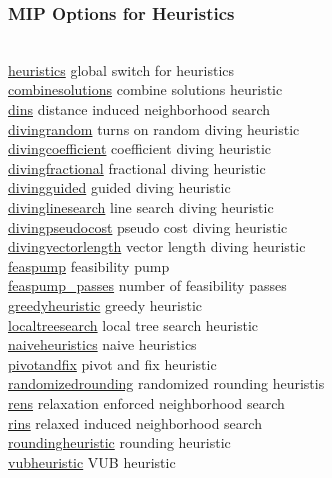 \subsubsection{MIP Options for Heuristics}
\begin{tabbing}
\hspace {1.3in} \= \\
\hyperlink{heuristics}
{heuristics} \> global switch for heuristics \\
\hyperlink{combinesolutions}
{combinesolutions} \> combine solutions heuristic \\
\hyperlink{dins}
{dins} \> distance induced neighborhood search \\
\hyperlink{divingrandom}
{divingrandom} \> turns on random diving heuristic \\
\hyperlink{divingcoefficient}
{divingcoefficient} \> coefficient diving heuristic \\
\hyperlink{divingfractional}
{divingfractional} \> fractional diving heuristic \\
\hyperlink{divingguided}
{divingguided} \> guided diving heuristic \\
\hyperlink{divinglinesearch}
{divinglinesearch} \> line search diving heuristic \\
\hyperlink{divingpseudocost}
{divingpseudocost} \> pseudo cost diving heuristic \\
\hyperlink{divingvectorlength}
{divingvectorlength} \> vector length diving heuristic \\
\hyperlink{feaspump}
{feaspump} \> feasibility pump \\
\hyperlink{feaspump_passes}
{feaspump\_passes} \> number of feasibility passes \\
\hyperlink{greedyheuristic}
{greedyheuristic} \> greedy heuristic \\
\hyperlink{localtreesearch}
{localtreesearch} \> local tree search heuristic \\
\hyperlink{naiveheuristics}
{naiveheuristics} \> naive heuristics \\
\hyperlink{pivotandfix}
{pivotandfix} \> pivot and fix heuristic \\
\hyperlink{randomizedrounding}
{randomizedrounding} \> randomized rounding heuristis \\
\hyperlink{rens}
{rens} \> relaxation enforced neighborhood search \\
\hyperlink{rins}
{rins} \> relaxed induced neighborhood search \\
\hyperlink{roundingheuristic}
{roundingheuristic} \> rounding heuristic \\
\hyperlink{vubheuristic}
{vubheuristic} \> VUB heuristic
\end{tabbing}

